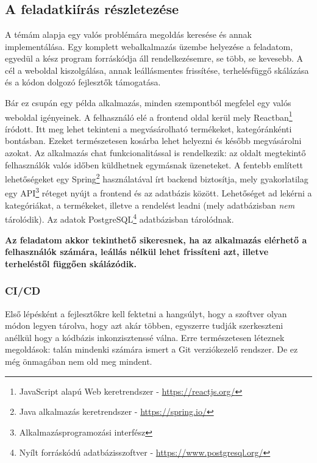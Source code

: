 \chapter{\bevezetes}

\section{A feladatkiírás részletezése}
A témám alapja egy valós problémára megoldás keresése és annak implementálása. Egy komplett webalkalmazás üzembe helyezése a feladatom, egyedül a kész program forráskódja áll rendelkezésemre, se több, se kevesebb. A cél a weboldal kiszolgálása, annak leállásmentes frissítése, terhelésfüggő skálázása és a kódon dolgozó fejlesztők támogatása.

Bár ez csupán egy példa alkalmazás, minden szempontból megfelel egy valós weboldal igényeinek. A felhasználó elé a frontend oldal kerül mely Reactban\footnote{JavaScript alapú Web keretrendszer - \url{https://reactjs.org/}} íródott. Itt meg lehet tekinteni a megvásárolható termékeket, kategóránkénti bontásban. Ezeket természetesen kosárba lehet helyezni és később megvásárolni azokat. Az alkalmazás chat funkcionalitással is rendelkezik: az oldalt megtekintő felhasználók valós időben küldhetnek egymásnak üzeneteket. A fentebb említett lehetőségeket egy Spring\footnote{Java alkalmazás keretrendszer - \url{https://spring.io/}} használatával írt backend biztosítja, mely gyakorlatilag egy API\footnote{Alkalmazásprogramozási interfész} réteget nyújt a frontend és az adatbázis között. Lehetőséget ad lekérni a kategóriákat, a termékeket, illetve a rendelést leadni (mely adatbázisban \textit{nem} tárolódik). Az adatok PostgreSQL\footnote{Nyílt forráskódú adatbázisszoftver - \url{https://www.postgresql.org/}} adatbázisban tárolódnak.

\textbf{Az feladatom akkor tekinthető sikeresnek, ha az alkalmazás elérhető a felhasználók számára, leállás nélkül lehet frissíteni azt, illetve terheléstől függően skálázódik.}
\subsection{CI/CD}
Első lépésként a fejlesztőkre kell fektetni a hangsúlyt, hogy a szoftver olyan módon legyen tárolva, hogy azt akár többen, egyszerre tudják szerkeszteni anélkül hogy a kódbázis inkonzisztenssé válna. Erre természetesen léteznek megoldások: talán mindenki számára ismert a Git verziókezelő rendszer. De ez még önmagában nem old meg mindent.
